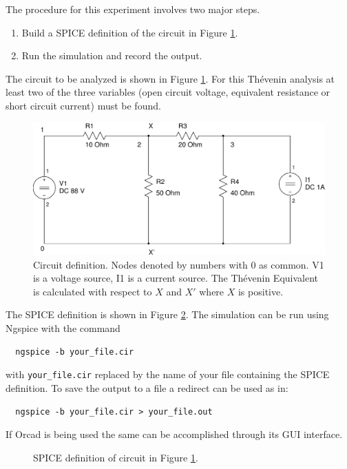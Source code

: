 \documentclass{article}
\begin{document}
The procedure for this experiment involves two major steps.
\begin{enumerate}
\item Build a SPICE definition of the circuit in Figure \ref{fig:circuit}.
\item Run the simulation and record the output.
\end{enumerate}

The circuit to be analyzed is shown in Figure \ref{fig:circuit}.
For this Th\'{e}venin analysis at least two of the three
variables (open circuit voltage, equivalent resistance or short circuit current)
must be found.

\begin{figure}[!hbtp]
\center
\includegraphics[scale=0.5]{spice/circuit}
\caption{Circuit definition.
Nodes denoted by numbers with 0 as common.
V1 is a voltage source, I1 is a current source.
The Th\'{e}venin Equivalent is calculated with respect to $X$ and $X'$ where
$X$ is positive.
}
\label{fig:circuit}
\end{figure}

The SPICE definition is shown in Figure \ref{fig:spice}.
The simulation can be run using Ngspice with the command
\begin{verbatim}
  ngspice -b your_file.cir
\end{verbatim}
with \verb+your_file.cir+ replaced by the name of your file
containing the SPICE definition.
To save the output to a file a redirect can be used as
in:
\begin{verbatim}
  ngspice -b your_file.cir > your_file.out
\end{verbatim}
If Orcad is being used the same can be accomplished through
its GUI interface.

\begin{figure}[!hbtp]

\caption{SPICE definition of circuit in Figure \ref{fig:circuit}.}
\label{fig:spice}
\end{figure}
\end{document}
